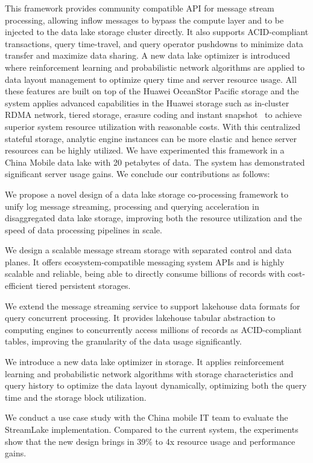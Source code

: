  This framework provides community compatible API for message stream processing, allowing inflow messages to bypass the compute layer and to be injected to the data lake storage cluster directly. It also supports ACID-compliant transactions, query time-travel, and query operator pushdowns to minimize data transfer and maximize data sharing. A new data lake optimizer is introduced where reinforcement learning and probabilistic network algorithms are applied to data layout management to optimize query time and server resource usage. All these features are built on top of the Huawei OceanStor Pacific storage and the system applies advanced capabilities in the Huawei storage such as in-cluster RDMA network, tiered storage, erasure coding and instant snapshot~\cite{} to achieve superior system resource utilization with reasonable costs. With this centralized stateful storage, analytic engine instances can be more elastic and hence server resources can be highly utilized. We have experimented this framework in a China Mobile data lake with 20 petabytes of data. The system has demonstrated significant server usage gains. We conclude our contributions as follows:

We propose a novel design of a data lake storage co-processing framework to unify log message streaming, processing and querying acceleration in disaggregated data lake storage, improving both the resource utilization and the speed of data processing pipelines in scale.


We design a scalable message stream storage with separated control and data planes. It offers ecosystem-compatible messaging system APIs and is highly scalable and reliable, being able to directly consume billions of records with cost-efficient tiered persistent storages. 


We extend the message streaming service to support lakehouse data formats for query concurrent processing. It provides lakehouse tabular abstraction to computing engines to concurrently access millions of records as ACID-compliant tables, improving the granularity of the data usage significantly.


We introduce a new data lake optimizer in storage. It applies reinforcement learning and probabilistic network algorithms with storage characteristics and query history to optimize the data layout dynamically, optimizing both the query time and the storage block utilization.

We conduct a use case study with the China mobile IT team to evaluate the StreamLake implementation. Compared to the current system, the experiments show that the new design brings in 39\% to 4x resource usage and performance gains.

\fi

